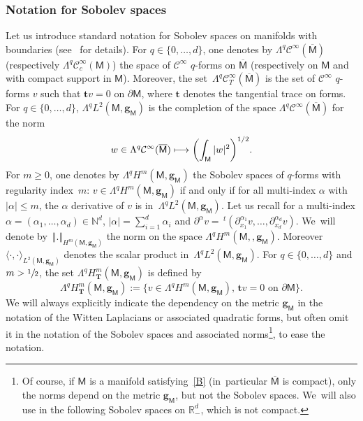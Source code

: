 \documentclass[JEP,XML,SOM,Unicode,NoEqCountersInSection,NoFloatCountersInSection,published]{cedram}
\newcommand\mto{\mathchoice{\longmapsto}{\mapsto}{\mapsto}{\mapsto}}
\newcommand{\mbf}[1]{\mathbf{#1}}
\theoremstyle{plain}
\theoremstyle{definition}
\begin{document}
\label{sec:Witt}

\subsubsection{Notation for Sobolev spaces}

Let us introduce standard notation for Sobolev spaces on manifolds
with boundaries (see~\cite{GSchw} for details).
For $q\in\{0,\ldots,d\}$, one denotes by
$\Lambda^q\mathcal C^{\infty}(\overline{\mathsf M})$ (respectively $\Lambda^q\mathcal C^\infty_c(\mathsf M)$) the space of $\mathcal C^{\infty}$ $q$-forms on
$\overline{\mathsf M}$ (respectively on $\mathsf M$ and with compact support in $\mathsf M$).
Moreover, the set~$\Lambda^q\mathcal C^{\infty}_T(\overline{\mathsf M})$ is the set of
$\mathcal C^{\infty}$ $q$-forms $v$ such that $\mbf tv=0$ on $\partial
\mathsf M$, where $\mathbf t$ denotes the tangential trace on forms.
For $q\in \{0, \ldots,d\}$, $\Lambda^qL^2(\mathsf M,\mbf g_{\mathsf M})$ is the completion of the space $\Lambda^q\mathcal C^{\infty}(\overline{\mathsf M})$ for the norm\vspace*{-3pt}
\[
w\in \Lambda^q\mathcal C^{\infty}(\overline{\mathsf M})\mto
\biggl(\int_{\mathsf M} \vert w\vert^2 \biggr)^{1/2}.
\]
For $m\ge 0$, one denotes by
$\Lambda^qH^m(\mathsf M,\mbf g_{\mathsf M})$ the Sobolev spaces of $q$-forms with
regularity index~$m$: $v\in \Lambda^qH^m(\mathsf M,\mbf g_{\mathsf
M})$ if and only if for all multi-index $\alpha$ with $\vert \alpha
\vert \le m$, the $\alpha$ derivative of $v$ is
in~$\Lambda^qL^2(\mathsf M,\mbf g_{\mathsf M})$. Let us recall for a
multi-index $\alpha=(\alpha_1,\ldots,\alpha_d) \in \mathbb N^d$, $\vert \alpha
\vert= \sum_{i=1}^d \alpha_i$ and $\partial^\alpha v= \,
^t(\partial_{x_1}^{\alpha_1} v, \ldots, \partial_{x_d}^{\alpha_d} v)$. We~will denote by~$\Vert. \Vert_{H^m(\mathsf M,\mbf g_{\mathsf M})}$ the norm on the space $\Lambda^qH^m
(\mathsf M,,\mbf g_{\mathsf M})$. Moreover $\langle
\cdot, \cdot\rangle_{L^2(\mathsf M,\mbf g_{\mathsf M})}$ denotes the scalar product in~$\Lambda^qL^2 (\mathsf M,\mbf g_{\mathsf M})$.
For $q\in\{0,\ldots,d\}$ and $m> \sfrac{1}{2}$, the set $\Lambda^qH^m_{\mbf T}(\mathsf M,\mbf g_{\mathsf M})$ is defined by\vspace*{-1pt}
\[
\Lambda^qH^m_{\mbf T}(\mathsf M,\mbf g_{\mathsf M}):=\{v\in \Lambda^qH^m(\mathsf M,\mbf g_{\mathsf M}),\,
 \mathbf tv=0 \text{ on } \partial \mathsf M\}.
\]
We will always explicitly indicate the dependency
on the metric $\mbf g_{\mathsf M}$ in the notation of the Witten
Laplacians or associated quadratic forms, but often omit it in the notation of the Sobolev
spaces and associated norms\footnote{Of course, if $\mathsf
M$ is a manifold satisfying~\ref{B} (in~particular $\overline{\mathsf
M}$ is compact),
only the norms depend on the metric $\mbf g_{\mathsf M}$, but not
the Sobolev spaces. We~will also use in the following Sobolev spaces
on $\mathbb R_-^d$, which is not compact.}, to ease the notation.
\end{document}
